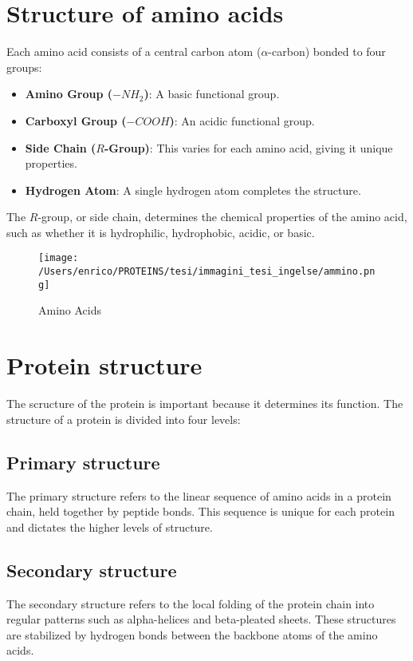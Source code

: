 \documentclass[English, Lau, oneside]{sapthesis}
\begin{document}
\newpage
\section{Structure of amino acids}
\noindent Each amino acid consists of a central carbon atom (\(\alpha\)-carbon) bonded to four groups:\cite{ref2} \\
\begin{itemize}
    \item \textbf{Amino Group (\(-NH_2\))}: A basic functional group.
    \item \textbf{Carboxyl Group (\(-COOH\))}: An acidic functional group.
    \item \textbf{Side Chain (\(R\)-Group)}: This varies for each amino acid, giving it unique properties.
    \item \textbf{Hydrogen Atom}: A single hydrogen atom completes the structure.
\end{itemize}

The \(R\)-group, or side chain, determines the chemical properties of the amino acid, such as whether it is hydrophilic, hydrophobic, acidic, or basic.
\begin{figure}[H]
    \centering
    \texttt{[image: /Users/enrico/PROTEINS/tesi/immagini\_tesi\_ingelse/ammino.png]}
    \caption{Amino Acids}
\end{figure}
\newpage
\section{Protein structure}
\noindent The scructure of the protein is important because it determines its function. 
The structure of a protein is divided into four levels:\cite{ref4}
\subsection{Primary structure}
\noindent The primary structure refers to the linear sequence of amino acids in a protein chain, held together by peptide bonds. This sequence is unique for each protein and dictates the higher levels of structure.

\subsection{Secondary structure}
\noindent The secondary structure refers to the local folding of the protein chain into regular patterns such as alpha-helices and beta-pleated sheets. These structures are stabilized by hydrogen bonds between the backbone atoms of the amino acids.
\end{document}
